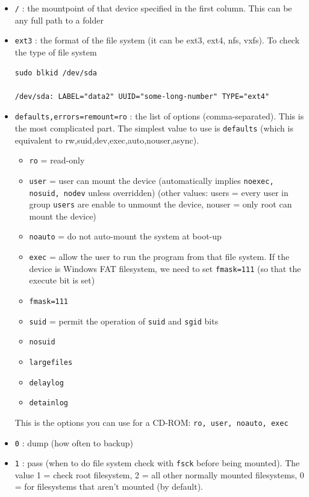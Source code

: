 \begin{itemize}
   
   \item \verb!/!  : the mountpoint of that device specified in the first
   column. This can be any full path to a folder
   
   \item \verb!ext3! : the format of the file system (it can be ext3, ext4,
   nfs, vxfs). To check the type of file system
   
\begin{verbatim}
sudo blkid /dev/sda

/dev/sda: LABEL="data2" UUID="some-long-number" TYPE="ext4"
\end{verbatim}
   
   \item \verb!defaults,errors=remount=ro! : the list of options
   (comma-separated). This is the most complicated part. The simplest value to
   use is \verb!defaults! (which is equivalent to
   rw,suid,dev,exec,auto,nouser,async).
   
   \begin{itemize}
     \item \verb!ro! = read-only
     \item \verb!user! = user can mount the device (automatically implies
     \verb!noexec, nosuid, nodev! unless overridden) (other values:
     users = every user in group \verb!users! are enable to unmount the device,
     nouser = only root can mount the device)
     \item \verb!noauto! = do not auto-mount the system at boot-up
     \item \verb!exec! = allow the user to run the program from that file
     system. If the device is Windows FAT filesystem, we need to set
     \verb!fmask=111! (so that the execute bit is set)
     \item \verb!fmask=111!
     \item \verb!suid!  = permit the operation of \verb!suid! and \verb!sgid!
     bits
     \item \verb!nosuid!
     \item \verb!largefiles!
     \item \verb!delaylog!
     \item \verb!detainlog!
   \end{itemize}
   
   This is the options you can use for a CD-ROM: \verb!ro, user, noauto, exec! 
   
   \item \verb!0! : dump (how often to backup) 
   
   \item \verb!1! : pass  (when to do file system check with \verb!fsck! before
   being mounted).  The value 1 = check root filesystem, 2 = all other normally
   mounted filesystems, 0 = for filesystems that aren't mounted (by default).

\end{itemize}

